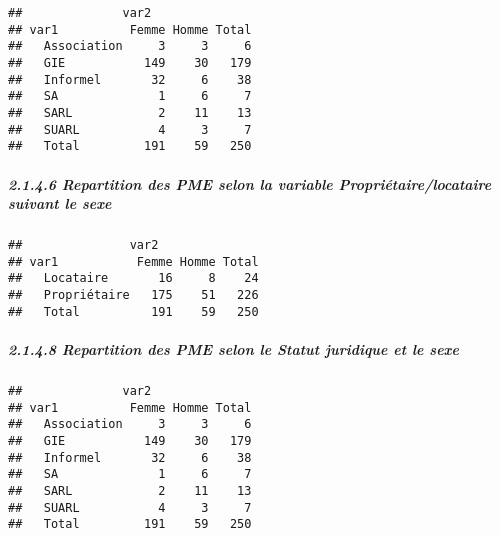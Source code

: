 \documentclass[
]{article}
\newenvironment{Shaded}{\begin{snugshade}}{\end{snugshade}}
\newcommand{\AttributeTok}[1]{\textcolor[rgb]{0.13,0.29,0.53}{#1}}
\newcommand{\FunctionTok}[1]{\textcolor[rgb]{0.13,0.29,0.53}{\textbf{#1}}}
\newcommand{\NormalTok}[1]{#1}
\newcommand{\SpecialCharTok}[1]{\textcolor[rgb]{0.81,0.36,0.00}{\textbf{#1}}}
\newcommand{\StringTok}[1]{\textcolor[rgb]{0.31,0.60,0.02}{#1}}
\begin{document}
\begin{verbatim}
##              var2
## var1          Femme Homme Total
##   Association     3     3     6
##   GIE           149    30   179
##   Informel       32     6    38
##   SA              1     6     7
##   SARL            2    11    13
##   SUARL           4     3     7
##   Total         191    59   250
\end{verbatim}

\hypertarget{repartition-des-pme-selon-la-variable-propriuxe9tairelocataire-suivant-le-sexe}{%
\subparagraph{2.1.4.6 Repartition des PME selon la variable
Propriétaire/locataire suivant le
sexe}\label{repartition-des-pme-selon-la-variable-propriuxe9tairelocataire-suivant-le-sexe}}

\begin{Shaded}
\end{Shaded}

\begin{verbatim}
##               var2
## var1           Femme Homme Total
##   Locataire       16     8    24
##   Propriétaire   175    51   226
##   Total          191    59   250
\end{verbatim}

\hypertarget{repartition-des-pme-selon-le-statut-juridique-et-le-sexe}{%
\subparagraph{2.1.4.8 Repartition des PME selon le Statut juridique et
le
sexe}\label{repartition-des-pme-selon-le-statut-juridique-et-le-sexe}}

\begin{Shaded}
\end{Shaded}

\begin{verbatim}
##              var2
## var1          Femme Homme Total
##   Association     3     3     6
##   GIE           149    30   179
##   Informel       32     6    38
##   SA              1     6     7
##   SARL            2    11    13
##   SUARL           4     3     7
##   Total         191    59   250
\end{verbatim}
\end{document}
